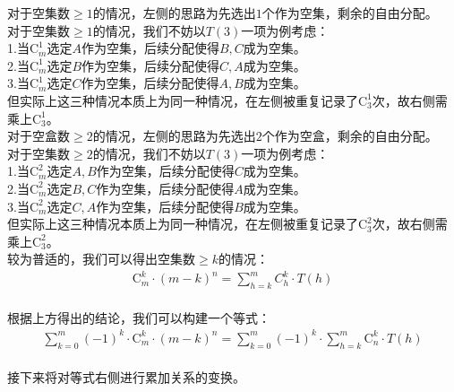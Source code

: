 \documentclass[UTF8]{ctexart}
\begin{document}
    对于空集数$\geq 1$的情况，左侧的思路为先选出$1$个作为空集，剩余的自由分配。\\[3mm]
    对于空集数$\geq 1$的情况，我们不妨以$T(3)$一项为例考虑：\\[3mm]
    1.当$\mathrm{C}_m^1$选定$A$作为空集，后续分配使得$B,C$成为空集。\\[3mm]
    2.当$\mathrm{C}_m^1$选定$B$作为空集，后续分配使得$C,A$成为空集。\\[3mm]
    3.当$\mathrm{C}_m^1$选定$C$作为空集，后续分配使得$A,B$成为空集。\\[3mm]
    但实际上这三种情况本质上为同一种情况，在左侧被重复记录了$\mathrm{C}_3^1$次，故右侧需乘上$\mathrm{C}_3^1$。\\[6mm]
    对于空盒数$\geq 2$的情况，左侧的思路为先选出$2$个作为空盒，剩余的自由分配。\\[3mm]
    对于空集数$\geq 2$的情况，我们不妨以$T(3)$一项为例考虑：\\[3mm]
    1.当$\mathrm{C}_m^2$选定$A,B$作为空集，后续分配使得$C$成为空集。\\[3mm]
    2.当$\mathrm{C}_m^2$选定$B,C$作为空集，后续分配使得$A$成为空集。\\[3mm]
    3.当$\mathrm{C}_m^2$选定$C,A$作为空集，后续分配使得$B$成为空集。\\[4mm]
    但实际上这三种情况本质上为同一种情况，在左侧被重复记录了$\mathrm{C}_3^2$次，故右侧需乘上$\mathrm{C}_3^2$。\\[6mm]
    较为普适的，我们可以得出空集数$\geq k$的情况：
    \begin{align}
        \mathrm{C}_m^k\cdot(m-k)^n=\sum_{h=k}^mC_h^k\cdot T(h)
    \end{align}\\
    根据上方得出的结论，我们可以构建一个等式：
    \begin{align}
        \sum_{k=0}^m(-1)^k\cdot\mathrm{C}_m^k\cdot(m-k)^n=\sum_{k=0}^m(-1)^k\cdot\sum_{h=k}^m\mathrm{C}_n^k\cdot T(h)
    \end{align}\\
    接下来将对等式右侧进行累加关系的变换。

\newpage
\end{document}
